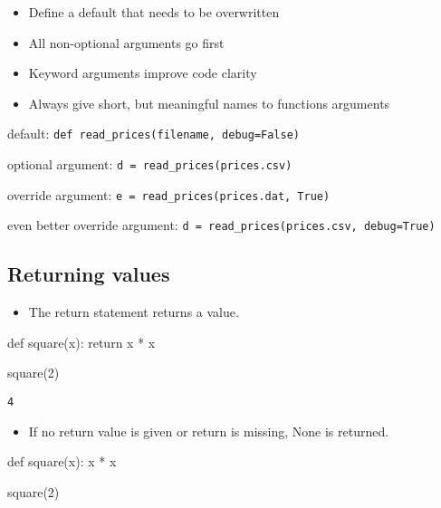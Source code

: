 \documentclass[
  letterpaper,
  DIV=11,
  numbers=noendperiod]{scrreprt}
\newenvironment{Shaded}{\begin{snugshade}}{\end{snugshade}}
\newcommand{\ControlFlowTok}[1]{\textcolor[rgb]{0.00,0.46,0.62}{#1}}
\newcommand{\DecValTok}[1]{\textcolor[rgb]{0.68,0.00,0.00}{#1}}
\newcommand{\KeywordTok}[1]{\textcolor[rgb]{0.00,0.46,0.62}{#1}}
\newcommand{\NormalTok}[1]{\textcolor[rgb]{0.00,0.46,0.62}{#1}}
\newcommand{\OperatorTok}[1]{\textcolor[rgb]{0.37,0.37,0.37}{#1}}
\providecommand{\tightlist}{%
  \setlength{\itemsep}{0pt}\setlength{\parskip}{0pt}}
\begin{document}
\begin{itemize}
\tightlist
\item
  Define a default that needs to be overwritten
\item
  All non-optional arguments go first
\item
  Keyword arguments improve code clarity
\item
  Always give short, but meaningful names to functions arguments
\end{itemize}

default: \texttt{def\ read\_prices(filename,\ debug=False)}

optional argument:
\texttt{d\ =\ read\_prices(\textquotesingle{}prices.csv\textquotesingle{})}

override argument:
\texttt{e\ =\ read\_prices(\textquotesingle{}prices.dat\textquotesingle{},\ True)}

even better override argument:
\texttt{d\ =\ read\_prices(\textquotesingle{}prices.csv\textquotesingle{},\ debug=True)}

\hypertarget{returning-values}{%
\subsection{Returning values}\label{returning-values}}

\begin{itemize}
\tightlist
\item
  The return statement returns a value.
\end{itemize}

\begin{Shaded}
\begin{Highlighting}[]
\KeywordTok{def}\NormalTok{ square(x):}
    \ControlFlowTok{return}\NormalTok{ x }\OperatorTok{*}\NormalTok{ x}

\NormalTok{square(}\DecValTok{2}\NormalTok{)}
\end{Highlighting}
\end{Shaded}

\begin{verbatim}
4
\end{verbatim}

\begin{itemize}
\tightlist
\item
  If no return value is given or return is missing, None is returned.
\end{itemize}

\begin{Shaded}
\begin{Highlighting}[]
\KeywordTok{def}\NormalTok{ square(x):}
\NormalTok{    x }\OperatorTok{*}\NormalTok{ x}

\NormalTok{square(}\DecValTok{2}\NormalTok{)}
\end{Highlighting}
\end{Shaded}
\end{document}
